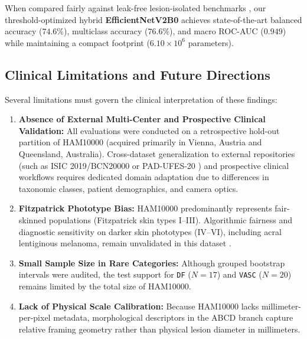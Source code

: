 \documentclass[11pt,a4paper]{article}
\begin{document}
When compared fairly against leak-free lesion-isolated benchmarks \cite{tschandl2018, maron2019, cassidy2022}, our threshold-optimized hybrid \textbf{EfficientNetV2B0} achieves state-of-the-art balanced accuracy ($74.6\%$), multiclass accuracy ($76.6\%$), and macro ROC-AUC ($0.949$) while maintaining a compact footprint ($6.10 \times 10^6$ parameters).

\subsection{Clinical Limitations and Future Directions}
Several limitations must govern the clinical interpretation of these findings:
\begin{enumerate}
    \item \textbf{Absence of External Multi-Center and Prospective Clinical Validation:} All evaluations were conducted on a retrospective hold-out partition of HAM10000 (acquired primarily in Vienna, Austria and Queensland, Australia). Cross-dataset generalization to external repositories (such as ISIC 2019/BCN20000 \cite{combalia2019} or PAD-UFES-20 \cite{pacheco2020}) and prospective clinical workflows requires dedicated domain adaptation due to differences in taxonomic classes, patient demographics, and camera optics.
    \item \textbf{Fitzpatrick Phototype Bias:} HAM10000 predominantly represents fair-skinned populations (Fitzpatrick skin types I--III). Algorithmic fairness and diagnostic sensitivity on darker skin phototypes (IV--VI), including acral lentiginous melanoma, remain unvalidated in this dataset \cite{daneshjou2022}.
    \item \textbf{Small Sample Size in Rare Categories:} Although grouped bootstrap intervals were audited, the test support for \texttt{DF} ($N=17$) and \texttt{VASC} ($N=20$) remains limited by the total size of HAM10000.
    \item \textbf{Lack of Physical Scale Calibration:} Because HAM10000 lacks millimeter-per-pixel metadata, morphological descriptors in the ABCD branch capture relative framing geometry rather than physical lesion diameter in millimeters.
\end{enumerate}

\end{document}
